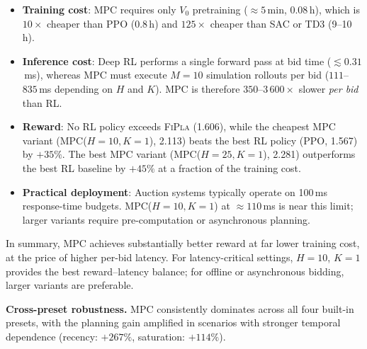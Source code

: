 \documentclass[11pt]{article}
\begin{document}
\begin{itemize}
  \item \textbf{Training cost}: MPC requires only $V_0$ pretraining ($\approx 5$\,min,
        0.08\,h), which is $10\times$ cheaper than PPO (0.8\,h) and $125\times$ cheaper
        than SAC or TD3 (9--10\,h).

  \item \textbf{Inference cost}: Deep RL performs a single forward pass at bid time
        ($\lesssim 0.31$\,ms), whereas MPC must execute $M{=}10$ simulation rollouts
        per bid ($111$--$835$\,ms depending on $H$ and $K$).  MPC is therefore
        $350$--$3\,600\times$ slower \emph{per bid} than RL.

  \item \textbf{Reward}: No RL policy exceeds \textsc{FiPla} (1.606), while the cheapest
        MPC variant (\textsc{MPC}($H{=}10,K{=}1$), 2.113) beats the best RL policy
        (PPO, 1.567) by $+35\%$.  The best MPC variant (\textsc{MPC}($H{=}25,K{=}1$),
        2.281) outperforms the best RL baseline by $+45\%$ at a fraction of the
        training cost.

  \item \textbf{Practical deployment}: Auction systems typically operate on 100\,ms
        response-time budgets.  \textsc{MPC}($H{=}10,K{=}1$) at $\approx 110$\,ms
        is near this limit; larger variants require pre-computation or asynchronous
        planning.
\end{itemize}

In summary, MPC achieves substantially better reward at far lower training cost, at the
price of higher per-bid latency.  For latency-critical settings, $H{=}10$, $K{=}1$
provides the best reward--latency balance; for offline or asynchronous bidding,
larger variants are preferable.

\bigskip

\noindent\textbf{Cross-preset robustness.}\quad
MPC consistently dominates across all four built-in presets, with the planning
gain amplified in scenarios with stronger temporal dependence
(recency: $+267\%$, saturation: $+114\%$).
\end{document}
